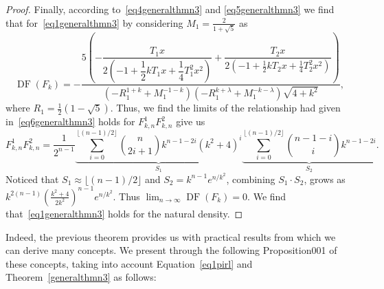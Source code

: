 \documentclass[11pt, a4paper]{article}
\theoremstyle{definition}
\begin{document}
\begin{proof}
Finally, according to~\eqref{eq4generalthmn3} and \eqref{eq5generalthmn3} we find that for~\eqref{eq1generalthmn3} by considering $M_1=\frac{2}{1 + \sqrt{5}}$  as 
\begin{equation}~\label{eq6generalthmn3}
\operatorname{DF}(F_k)=-\dfrac{5 \left(-\dfrac{T_1 x}{
2 \left(-1 + \dfrac{1}{2} k T_1 x + \dfrac{1}{4} T_1^2 x^2 \right)}+ \dfrac{T_2 x}{2 \left(-1 + \frac{1}{2} k T_2 x + \frac{1}{4} T_2^2 x^2 \right)}\right)}{ \left(
-R_1^{1 + k} + M_1^{-1 - k} \right) \left( -R_1^{k + \lambda} + M_1^{-k - \lambda} \right) \sqrt{4 + k^2} },
\end{equation}
where $R_1=\frac{1}{2} (1 - \sqrt{5})$. Thus, we find the limits of the relationship had given in~\eqref{eq6generalthmn3} holds for $F^{1}_{k,n}F^{2}_{k,n}$ give us
\[
F^{1}_{k,n}F^{2}_{k,n}=\frac{1}{2^{n-1}}\underbrace{\sum_{i=0}^{\lfloor (n-1)/2 \rfloor} \binom{n}{2i+1} k^{n-1-2i} (k^2 + 4)^i}_{S_1} \underbrace{\sum_{i=0}^{\lfloor (n-1)/2 \rfloor} \binom{n-1-i}{i} k^{n-1-2i}}_{S_2}.
\]
Noticed that $S_1 \approx \lfloor (n-1)/2 \rfloor$ and $S_2= k^{n-1} e^{n/k^2}$, combining $S_1 \cdot S_2$, grows as $k^{2(n-1)} \left( \frac{k^2 + 4}{2 k^2} \right)^{n-1} e^{n/k^2}$. Thus $\lim_{n\to \infty} \operatorname{DF}(F_k)=0.$ We find that~\eqref{eq1generalthmn3} holds for the natural density. 
\end{proof}
Indeed, the previous theorem provides us with practical results from which we can derive many concepts. We present through the following Proposition001 of these concepts, taking into account Equation~\eqref{eq1pirl} and Theorem~\ref{generalthmn3} as follows:
\end{document}
